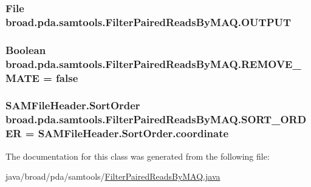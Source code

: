 \hypertarget{classbroad_1_1pda_1_1samtools_1_1_filter_paired_reads_by_m_a_q_a375591d5d4b86341a090330125e56d8d}{
\subsubsection[{O\+U\+T\+P\+U\+T}]{\setlength{\rightskip}{0pt plus 5cm}File broad.\+pda.\+samtools.\+Filter\+Paired\+Reads\+By\+M\+A\+Q.\+O\+U\+T\+P\+U\+T}}\label{classbroad_1_1pda_1_1samtools_1_1_filter_paired_reads_by_m_a_q_a375591d5d4b86341a090330125e56d8d}
\hypertarget{classbroad_1_1pda_1_1samtools_1_1_filter_paired_reads_by_m_a_q_a2dd4db8bc62e0667cdb2bf2018f34f22}{
\subsubsection[{R\+E\+M\+O\+V\+E\+\_\+\+M\+A\+T\+E}]{\setlength{\rightskip}{0pt plus 5cm}Boolean broad.\+pda.\+samtools.\+Filter\+Paired\+Reads\+By\+M\+A\+Q.\+R\+E\+M\+O\+V\+E\+\_\+\+M\+A\+T\+E = false}}\label{classbroad_1_1pda_1_1samtools_1_1_filter_paired_reads_by_m_a_q_a2dd4db8bc62e0667cdb2bf2018f34f22}
\hypertarget{classbroad_1_1pda_1_1samtools_1_1_filter_paired_reads_by_m_a_q_a9a1d0819235dc343e31ec22d14c3bbac}{
\subsubsection[{S\+O\+R\+T\+\_\+\+O\+R\+D\+E\+R}]{\setlength{\rightskip}{0pt plus 5cm}S\+A\+M\+File\+Header.\+Sort\+Order broad.\+pda.\+samtools.\+Filter\+Paired\+Reads\+By\+M\+A\+Q.\+S\+O\+R\+T\+\_\+\+O\+R\+D\+E\+R = S\+A\+M\+File\+Header.\+Sort\+Order.\+coordinate}}\label{classbroad_1_1pda_1_1samtools_1_1_filter_paired_reads_by_m_a_q_a9a1d0819235dc343e31ec22d14c3bbac}


The documentation for this class was generated from the following file\+:\begin{DoxyCompactItemize}
\item 
java/broad/pda/samtools/\hyperlink{_filter_paired_reads_by_m_a_q_8java}{Filter\+Paired\+Reads\+By\+M\+A\+Q.\+java}\end{DoxyCompactItemize}
